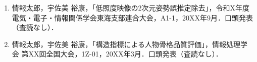 \noindent\UsamiFictionalExampleNotice
\begingroup
\small
\setlength{\topsep}{1pt}
\setlength{\partopsep}{0pt}
\begin{enumerate}
  \setlength{\itemsep}{1pt}
  \setlength{\parsep}{0pt}
  \setlength{\parskip}{0pt}
  \item 情報太郎，宇佐美 裕康，「低照度映像の2次元姿勢誤推定除去」，令和X年度 電気・電子・情報関係学会東海支部連合大会，A1-1，20XX年9月．口頭発表（査読なし）．
  \item 情報太郎，宇佐美 裕康，「構造指標による人物骨格品質評価」，情報処理学会 第XX回全国大会，1Z-01，20XX年3月．口頭発表（査読なし）．
\end{enumerate}
\endgroup
